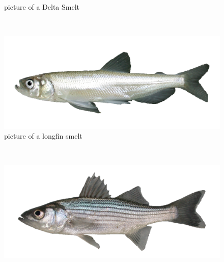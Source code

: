 \documentclass[
]{book}
\begin{document}
\begin{panel-grid}
\begin{columns-nocenter}
\begin{column800}
\begin{figure}
{}

\caption{picture of a Delta Smelt}\label{fig:unnamed-chunk-121}
\end{figure}

\end{column800}

\begin{column40}

~

\end{column40}

\begin{column800}

\begin{figure}

{\centering \includegraphics[width=29.17in]{figures/longfin_smelt_adult} 

}

\caption{picture of a longfin smelt}\label{fig:unnamed-chunk-122}
\end{figure}

\end{column800}

\begin{column40}

~

\end{column40}

\begin{column800}

\begin{figure}

{\centering \includegraphics[width=29.17in]{figures/striped_bass_young_adult} 

}
\end{figure}
\end{column800}
\end{columns-nocenter}
\end{panel-grid}
\end{document}
